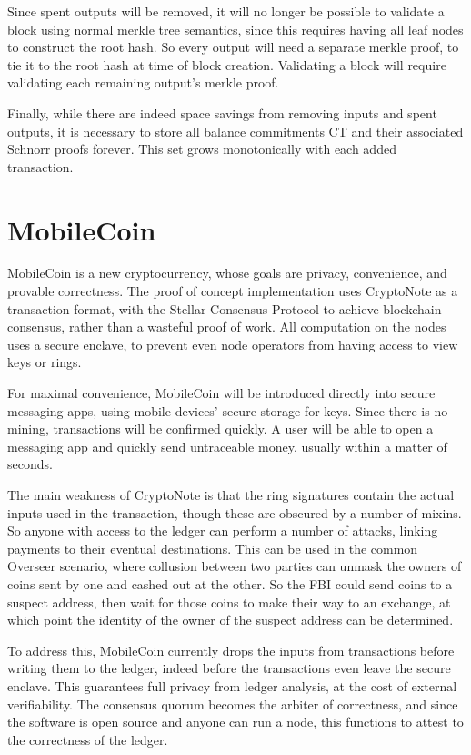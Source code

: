 \documentclass{article}
\begin{document}
Since spent outputs will be removed, it will no longer be possible to validate a block using normal merkle tree semantics, since this requires having all leaf nodes to construct the root hash.  So every output will need a separate merkle proof, to tie it to the root hash at time of block creation.  Validating a block will require validating each remaining output's merkle proof.

Finally, while there are indeed space savings from removing inputs and spent outputs, it is necessary to store all balance commitments CT and their associated Schnorr proofs forever.  This set grows monotonically with each added transaction.  



\section{MobileCoin}

MobileCoin is a new cryptocurrency, whose goals are privacy, convenience, and provable correctness.  The proof of concept implementation uses CryptoNote as a transaction format, with the Stellar Consensus Protocol to achieve blockchain consensus, rather than a wasteful proof of work.  All computation on the nodes uses a secure enclave, to prevent even node operators from having access to view keys or rings.  

For maximal convenience, MobileCoin will be introduced directly into secure messaging apps, using mobile devices' secure storage for keys.  Since there is no mining, transactions will be confirmed quickly.  A user will be able to open a messaging app and quickly send untraceable money, usually within a matter of seconds.

The main weakness of CryptoNote is that the ring signatures contain the actual inputs used in the transaction, though these are obscured by a number of mixins.  So anyone with access to the ledger can perform a number of attacks, linking payments to their eventual destinations.  This can be used in the common Overseer scenario, where collusion between two parties can unmask the owners of coins sent by one and cashed out at the other.  So the FBI could send coins to a suspect address, then wait for those coins to make their way to an exchange, at which point the identity of the owner of the suspect address can be determined.

To address this, MobileCoin currently drops the inputs from transactions before writing them to the ledger, indeed before the transactions even leave the secure enclave.  This guarantees full privacy from ledger analysis, at the cost of external verifiability.  The consensus quorum becomes the arbiter of correctness, and since the software is open source and anyone can run a node, this functions to attest to the correctness of the ledger.
\end{document}
